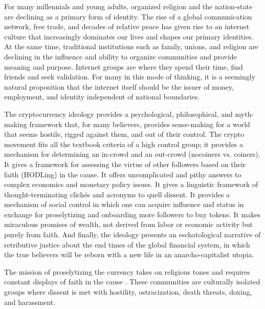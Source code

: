 

For many millennials and young adults, organized religion and the nation-state
are declining as a primary form of identity. The rise of a global communication
network, free trade, and decades of relative peace has given rise to an internet
culture that increasingly dominates our lives and shapes our primary identities.
At the same time, traditional institutions such as family, unions, and religion
are declining in the influence and ability to organize communities and provide
meaning and purpose. Internet groups are where they spend their time, find
friends and seek validation. For many in this mode of thinking, it is a
seemingly natural proposition that the internet itself should be the issuer of
money, employment, and identity independent of national boundaries.

The cryptocurrency ideology provides a psychological, philosophical, and
myth-making framework \cite{faustino_myths_2021} that, for many believers,
provides sense-making for a world that seems hostile, rigged against them, and
out of their control. The crypto movement fits all the textbook criteria of a
high control group; it provides a mechanism for determining an in-crowd and an
out-crowd (nocoiners vs. coiners). It gives a framework for assessing the virtue
of other followers based on their faith (HODLing) in the cause. It offers
uncomplicated and pithy answers to complex economics and monetary policy issues.
It gives a linguistic framework of thought-terminating clichés and acronyms to
quell dissent. It provides a mechanism of social control in which one can
acquire influence and status in exchange for proselytizing and onboarding more
followers to buy tokens. It makes miraculous promises of wealth, not derived
from labor or economic activity but purely from faith. And finally, the ideology
presents an eschatological narrative of retributive justice about the end times
of the global financial system, in which the true believers will be reborn with
a new life in an anarcho-capitalist utopia.


The mission of proselytizing the currency takes on religious tones and requires
constant displays of faith in the cause \cite{@golumbia2018zealots}. These
communities are culturally isolated groups where dissent is met with hostility,
ostracization, death threats, doxing, and harassment.


